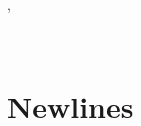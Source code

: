 \documentclass[a4paper]{article}
\begin{document}
\begin{alectryon}
\begin{sentence}
\begin{input}
    \end{input}
    \sep
    \begin{output}
      \begin{messages}
        \begin{message}
          ~\PY{o}{[(}~~~~~\PY{o}{)]}\nl
          ~~~~
        \end{message}
      \end{messages}
    \end{output}
  \end{sentence}
\end{alectryon}


\section{Newlines%
  \label{newlines}%
}
\end{document}
